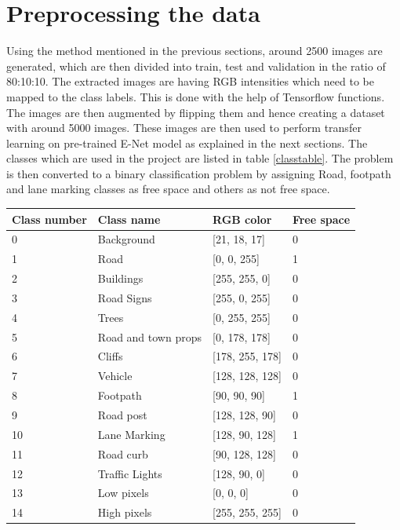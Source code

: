 \documentclass[a4paper, 12pt, oneside, BCOR1cm,toc=chapterentrywithdots]{scrbook}
\begin{document}
\section{Preprocessing the data}

Using the method mentioned in the previous sections, around 2500 images are generated, which are then divided into train, test and validation in the ratio of 80:10:10. The extracted images are having RGB intensities which need to be mapped to the class labels. This is done with the help of Tensorflow functions. The images are then augmented by flipping them and hence creating a dataset with around 5000 images. These images are then used to perform transfer learning on pre-trained E-Net model as explained in the next sections. The classes which are used in the project are listed in table \ref{classtable}. The problem is then converted to a binary classification problem by assigning Road, footpath and lane marking classes as free space and others as not free space. 



\begin{center}
\label{classtable}
\begin{tabular}{| l | l | l | l |}
\hline
Class number & Class name & RGB color & Free space\\
\hline
0 & Background & [21, 18, 17] & 0\\
\hline
1 & Road & [0, 0, 255] & 1\\
\hline
2 & Buildings & [255, 255, 0] & 0\\
\hline
3 & Road Signs & [255, 0, 255] & 0\\
\hline
4 & Trees & [0, 255, 255] & 0\\
\hline
5 & Road and town props & [0, 178, 178] & 0\\
\hline
6 & Cliffs & [178, 255, 178] & 0\\
\hline
7 & Vehicle & [128, 128, 128] & 0\\
\hline
8 & Footpath & [90, 90, 90] & 1\\
\hline
9 & Road post & [128, 128, 90] & 0\\
\hline
10 & Lane Marking & [128, 90, 128] & 1\\
\hline
11 & Road curb & [90, 128, 128] & 0\\
\hline
12 & Traffic Lights & [128, 90, 0] & 0\\
\hline
13 & Low pixels & [0, 0, 0] & 0\\
\hline
14 & High pixels & [255, 255, 255] & 0\\
\hline
\end{tabular}

\end{center}
\end{document}
